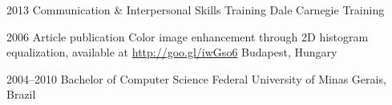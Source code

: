 \documentclass[]{friggeri-cv}
\begin{document}
\begin{entrylist}

\entry
{2013}
{Communication \& Interpersonal {\normalfont Skills Training}}
{Dale Carnegie Training}


\entry
{2006}
{Article publication {\normalfont Color image enhancement through 2D histogram equalization, available at \url{http://goo.gl/iwGso6}}}
{Budapest, Hungary}


\entry
{2004--2010}
{{\normalfont Bachelor of} Computer Science}
{Federal University of Minas Gerais, Brazil}

\end{entrylist}
\end{document}
